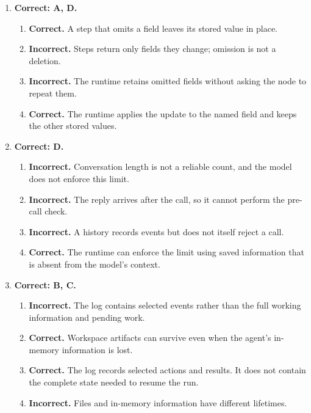\begin{enumerate}[start=11,itemsep=0.7\baselineskip]
\item[{\hyperref[exercise:11]{11.}}] \begin{minipage}[t]{\linewidth}
\textbf{Correct: A, D.}
\begin{enumerate}[label=\textnormal{(\Alph*)},leftmargin=*,itemsep=0pt]
\item \textbf{Correct.} A step that omits a field leaves its stored value in place.
\item \textbf{Incorrect.} Steps return only fields they change; omission is not a deletion.
\item \textbf{Incorrect.} The runtime retains omitted fields without asking the node to repeat them.
\item \textbf{Correct.} The runtime applies the update to the named field and keeps the other stored values.
\end{enumerate}
\end{minipage}

\item[{\hyperref[exercise:12]{12.}}] \begin{minipage}[t]{\linewidth}
\textbf{Correct: D.}
\begin{enumerate}[label=\textnormal{(\Alph*)},leftmargin=*,itemsep=0pt]
\item \textbf{Incorrect.} Conversation length is not a reliable count, and the model does not enforce this limit.
\item \textbf{Incorrect.} The reply arrives after the call, so it cannot perform the pre-call check.
\item \textbf{Incorrect.} A history records events but does not itself reject a call.
\item \textbf{Correct.} The runtime can enforce the limit using saved information that is absent from the model's context.
\end{enumerate}
\end{minipage}

\item[{\hyperref[exercise:13]{13.}}] \begin{minipage}[t]{\linewidth}
\textbf{Correct: B, C.}
\begin{enumerate}[label=\textnormal{(\Alph*)},leftmargin=*,itemsep=0pt]
\item \textbf{Incorrect.} The log contains selected events rather than the full working information and pending work.
\item \textbf{Correct.} Workspace artifacts can survive even when the agent's in-memory information is lost.
\item \textbf{Correct.} The log records selected actions and results. It does not contain the complete state needed to resume the run.
\item \textbf{Incorrect.} Files and in-memory information have different lifetimes.
\end{enumerate}
\end{minipage}


\end{enumerate}
